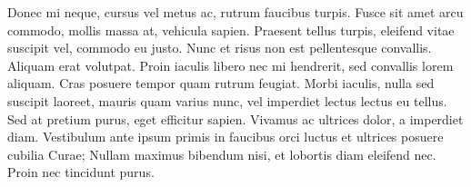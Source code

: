 Donec mi neque, cursus vel metus ac, rutrum faucibus turpis. Fusce sit amet arcu commodo, mollis massa at, vehicula sapien. Praesent tellus turpis, eleifend vitae suscipit vel, commodo eu justo. Nunc et risus non est pellentesque convallis. Aliquam erat volutpat. Proin iaculis libero nec mi hendrerit, sed convallis lorem aliquam. Cras posuere tempor quam rutrum feugiat. Morbi iaculis, nulla sed suscipit laoreet, mauris quam varius nunc, vel imperdiet lectus lectus eu tellus. Sed at pretium purus, eget efficitur sapien. Vivamus ac ultrices dolor, a imperdiet diam. Vestibulum ante ipsum primis in faucibus orci luctus et ultrices posuere cubilia Curae; Nullam maximus bibendum nisi, et lobortis diam eleifend nec. Proin nec tincidunt purus. 